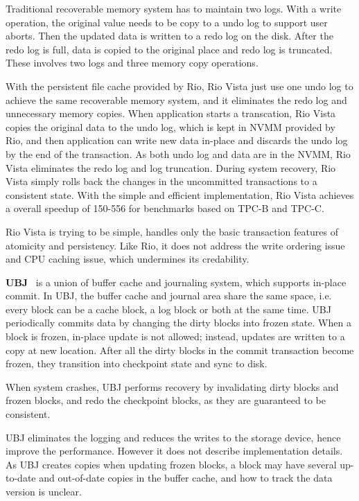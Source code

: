 Traditional recoverable memory system has to maintain two logs. With a write
operation, the original value needs to be copy to a undo log to support user
aborts. Then the updated data is written to a redo log on the disk. After
the redo log is full, data is copied to the original place and redo log is
truncated. These involves two logs and three memory copy operations.

With the persistent file cache provided by Rio,
Rio Vista just use one undo log to achieve the same recoverable memory system,
and it eliminates the redo log
and unnecessary memory copies. When
application starts a transcation, Rio Vista copies the original data to the 
undo log, which is kept in NVMM provided by Rio, and then application can
write new data in-place and discards the undo log by the end of the transaction.
As both undo log and data are in the NVMM, Rio Vista eliminates the redo log and
log truncation. During system recovery, Rio Vista simply rolls back the changes
in the uncommitted transactions to a consistent state.
With the simple and efficient implementation, Rio Vista
achieves a overall speedup of 150-556\x{} for benchmarks based on TPC-B and
TPC-C.

Rio Vista is trying to be simple, handles only the basic transaction features
of atomicity and persistency. Like Rio, it does not address the write ordering
issue and CPU caching issue, which undermines its credability. 

\textbf{UBJ}~\cite{UBJ} is a union of buffer cache and journaling system,
which supports in-place commit. In UBJ, the buffer cache and journal area
share the same space, i.e. every block can be a cache block, a log block
or both at the same time. UBJ periodically commits data by changing the dirty
blocks into frozen state. When a block is frozen, in-place update is not
allowed; instead, updates are written to a copy at new location. After all
the dirty blocks in the commit transaction become frozen, they transition
into checkpoint state and sync to disk.

When system crashes, UBJ performs recovery by invalidating dirty blocks and 
frozen blocks, and redo the checkpoint blocks, as they are guaranteed to be
consistent. 

UBJ eliminates the logging and reduces the writes to the storage device,
hence improve the performance. However it does not describe implementation
details. As UBJ creates copies when updating frozen blocks, a block may
have several up-to-date and out-of-date copies in the buffer cache, and
how to track the data version is unclear.

